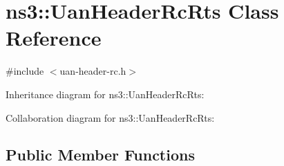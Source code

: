 \hypertarget{classns3_1_1UanHeaderRcRts}{}\section{ns3\+:\+:Uan\+Header\+Rc\+Rts Class Reference}
\label{classns3_1_1UanHeaderRcRts}


{\ttfamily \#include $<$uan-\/header-\/rc.\+h$>$}



Inheritance diagram for ns3\+:\+:Uan\+Header\+Rc\+Rts\+:


Collaboration diagram for ns3\+:\+:Uan\+Header\+Rc\+Rts\+:
\subsection*{Public Member Functions}
